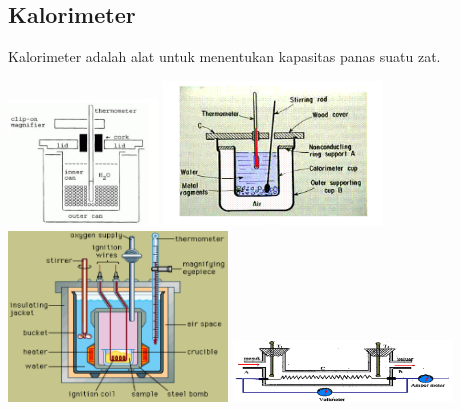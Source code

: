 \documentclass[twocolumn, 11pt]{article}%
\begin{document}
    \subsection{Kalorimeter}
        Kalorimeter adalah alat untuk menentukan kapasitas panas suatu zat.
        
        \begin{center}
            \includegraphics[width=150px]{11.png}
            \includegraphics[width=220px]{12.png}
            \includegraphics[width=220px]{13.png}
            \includegraphics[width=220px]{14.png}
        \end{center}
\end{document}
